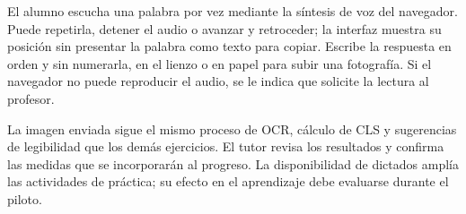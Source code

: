 El alumno escucha una palabra por vez mediante la síntesis de voz del
navegador. Puede repetirla, detener el audio o avanzar y retroceder; la
interfaz muestra su posición sin presentar la palabra como texto para copiar.
Escribe la respuesta en orden y sin numerarla, en el lienzo o en papel para
subir una fotografía. Si el navegador no puede reproducir el audio, se le
indica que solicite la lectura al profesor.

La imagen enviada sigue el mismo proceso de OCR, cálculo de CLS y sugerencias
de legibilidad que los demás ejercicios. El tutor revisa los resultados y
confirma las medidas que se incorporarán al progreso. La disponibilidad de
dictados amplía las actividades de práctica; su efecto en el aprendizaje debe
evaluarse durante el piloto.
